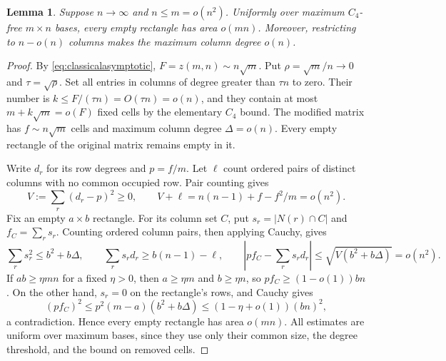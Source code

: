 \documentclass[11pt]{article}
\newtheorem{lemma}[theorem]{Lemma}
\begin{document}
\begin{lemma}\label{lem:subquadraticmixing}
Suppose $n\to\infty$ and $n\le m=o(n^2)$. Uniformly over maximum
$C_4$-free $m\times n$ bases, every empty rectangle has area $o(mn)$.
Moreover, restricting to $n-o(n)$ columns makes the maximum column
degree $o(n)$.
\end{lemma}
\begin{proof}
By \eqref{eq:classicalasymptotic}, $F=z(m,n)\sim n\sqrt m$.
Put $\rho=\sqrt m/n\to0$ and $\tau=\sqrt\rho$.
Set all entries in columns of degree greater than $\tau n$ to zero.
Their number is $k\le F/(\tau n)=O(\tau n)=o(n)$, and they contain
at most $m+k\sqrt m=o(F)$ fixed cells by the elementary $C_4$ bound.
The modified matrix has $f\sim n\sqrt m$ cells and maximum column
degree $\Delta=o(n)$. Every empty rectangle of the original matrix
remains empty in it.

Write $d_r$ for its row degrees and $p=f/m$.
Let $\ell$ count ordered pairs of distinct columns with no common
occupied row. Pair counting gives
\[
 V:=\sum_r(d_r-p)^2\ge0,\qquad
 V+\ell=n(n-1)+f-f^2/m=o(n^2).
\]
Fix an empty $a\times b$ rectangle. For its column set $C$, put
$s_r=|N(r)\cap C|$ and $f_C=\sum_r s_r$.
Counting ordered column pairs, then applying Cauchy, gives
\[
 \sum_r s_r^2\le b^2+b\Delta,\qquad
 \sum_r s_rd_r\ge b(n-1)-\ell,\qquad
 |pf_C-\sum_r s_rd_r|\le\sqrt{V(b^2+b\Delta)}=o(n^2).
\]
If $ab\ge\eta mn$ for a fixed $\eta>0$, then $a\ge\eta m$ and
$b\ge\eta n$, so $pf_C\ge(1-o(1))bn$.
On the other hand, $s_r=0$ on the rectangle's rows, and Cauchy gives
\[
 (pf_C)^2\le p^2(m-a)(b^2+b\Delta)
 \le(1-\eta+o(1))(bn)^2,
\]
a contradiction. Hence every empty rectangle has area $o(mn)$.
All estimates are uniform over maximum bases, since they use only their
common size, the degree threshold, and the bound on removed cells.
\end{proof}
\end{document}
